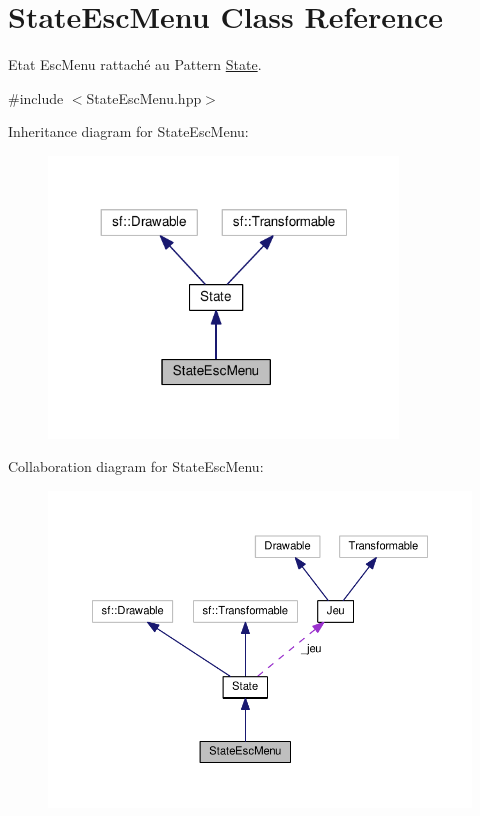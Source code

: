 \hypertarget{class_state_esc_menu}{\section{State\+Esc\+Menu Class Reference}
\label{class_state_esc_menu}
}


Etat Esc\+Menu rattaché au Pattern \hyperlink{class_state}{State}.  




{\ttfamily \#include $<$State\+Esc\+Menu.\+hpp$>$}



Inheritance diagram for State\+Esc\+Menu\+:
\nopagebreak
\begin{figure}[H]
\begin{center}
\leavevmode
\includegraphics[width=263pt]{class_state_esc_menu__inherit__graph}
\end{center}
\end{figure}


Collaboration diagram for State\+Esc\+Menu\+:
\nopagebreak
\begin{figure}[H]
\begin{center}
\leavevmode
\includegraphics[width=350pt]{class_state_esc_menu__coll__graph}
\end{center}
\end{figure}
